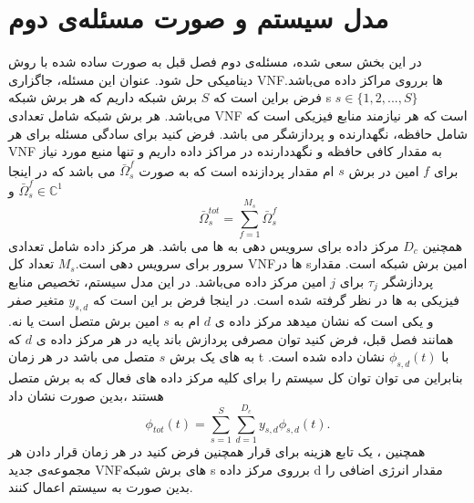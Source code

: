 \section{ مدل سیستم و صورت مسئله‌ی دوم}
در این بخش سعی شده، مسئله‌ی دوم فصل قبل به صورت ساده شده با روش دینامیکی حل شود. عنوان این مسئله، جاگزاری VNFها برروی مراکز داده می‌باشد.
فرض براین است که $S$ برش شبکه داریم که هر برش شبکه s
$s\in \{1,2,...,S \} $
می‌باشد. هر برش شبکه شامل تعدادی VNF است که
هر 
نیازمند منابع فیزیکی است که شامل حافظه، نگهدارنده و پردازشگر می باشد.
فرض کنید برای سادگی مسئله برای هر VNF به مقدار کافی حافظه و نگهددارنده در مراکز داده داریم و تنها منبع مورد نیاز برای $f$ امین  در برش $s$ ام مقدار پردازنده است که به صورت $\bar{\Omega}_{s}^f$ می باشد 
که در اینجا 
$\bar{\Omega}_{s}^f\in \mathbb{C}^{1}$
و
\begin{equation}
	\textstyle \bar{\Omega}_{s}^{tot} = \sum_{f=1}^{M_{s}}\bar{\Omega}_{s}^f %
\end{equation}
همچنین $D_c$ مرکز داده برای سرویس دهی به  ها می باشد. هر مرکز داده شامل تعدادی سرور برای سرویس دهی است.$M_s$ تعداد کل VNFها در sامین برش شبکه است.
مقدار پردازشگر 
$\tau_{j} $
برای 
$j$
امین مرکز داده  می‌باشد.
در این مدل سیستم، 
تخصیص منابع فیزیکی به  ها در نظر گرفته شده است. 
در اینجا فرض بر این است که $y_{s,d}$ متغیر صفر و یکی است که نشان میدهد مرکز داده ی $d$ ام به $s$ امین برش متصل است یا نه. 
همانند فصل قبل، 
فرض کنید توان مصرفی پردازش باند پایه در هر مرکز داده ی $d$ که به  های یک برش $s$ متصل می باشد در هر زمان t با   
$\phi_{s,d}(t)$
نشان داده شده است.
بنابراین می توان توان کل سیستم را برای کلیه مرکز داده های فعال که به برش متصل هستند ،بدین صورت نشان داد
\begin{equation*}
	\textstyle \phi_{tot}(t) = \sum_{s=1}^{S}\sum_{d=1}^{D_c}y_{s,d}\phi_{s,d}(t).
\end{equation*}
همچنین ، یک تابع هزینه برای قرار
همچنین فرض کنید در هر زمان قرار دادن هر مجموعه‌ی جدید VNFهای برش شبکه s برروی مرکز داده d مقدار انرژی اضافی را بدین صورت به سیستم اعمال کنند.
